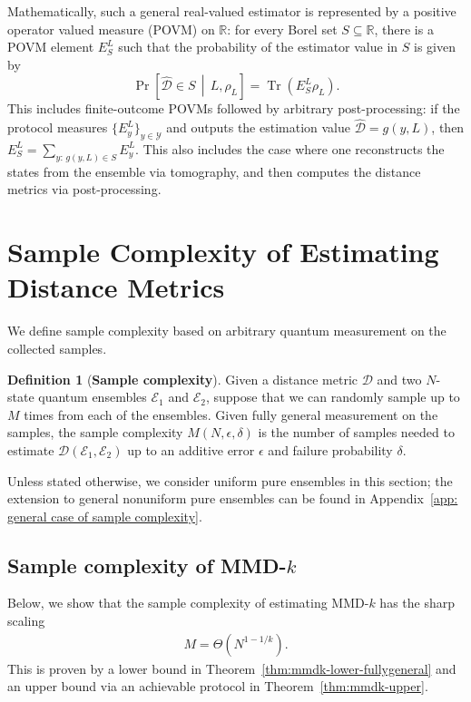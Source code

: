 \documentclass[aps,prx,reprint,superscriptaddress,amsmath,amssymb,longbibliography,floatfix]{revtex4-2}
\newcommand{\dsR}{\mathbb{R}}
\newcommand{\scD}{\mathcal{D}}
\newcommand{\scE}{\mathcal{E}}
\newcommand{\scY}{\mathcal{Y}}
\newcommand{\Tr}{\operatorname{Tr}}
\theoremstyle{plain}
\theoremstyle{definition}
\newtheorem{definition}[theorem]{Definition}
\theoremstyle{remark}
\begin{document}
Mathematically, such a general real-valued estimator is represented by a positive operator valued measure (POVM) on $\dsR$: for every Borel set $S\subseteq\dsR$, there is a POVM element $E_S^L$ such that the probability of the estimator value in $S$ is given by
\begin{equation}
\Pr\!\left[\widehat{\scD}\in S\,\middle|\,L,\rho_L\right]=\Tr(E_S^L\rho_L).
\end{equation}
This includes finite-outcome POVMs followed by arbitrary post-processing: if the protocol measures $\{E_y^L\}_{y\in\scY}$ and outputs the estimation value $\widehat{\scD}=g(y,L)$, then
$
E_S^L=\sum_{y:\,g(y,L)\in S}E_y^L.
$ 
This also includes the case where one reconstructs the states from the ensemble via tomography, and then computes the distance metrics via post-processing.







\section{Sample Complexity of Estimating Distance Metrics}\label{sec: sample complexity}

We define sample complexity based on arbitrary quantum measurement on the collected samples.
\begin{definition}[\textbf{Sample complexity}]
    Given a distance metric $\scD$ and two $N$-state quantum ensembles $\scE_1$ and $\scE_2$, suppose that we can randomly sample up to $M$ times from each of the ensembles. Given fully general measurement on the samples, the sample complexity $M(N,\epsilon,\delta)$ is the number of samples needed to estimate $\scD(\scE_1, \scE_2)$ up to an additive error $\epsilon$ and failure probability $\delta$.\label{def: sample complexity general}
\end{definition}
Unless stated otherwise, we consider uniform pure ensembles in this section; the extension to general nonuniform pure ensembles can be found in Appendix~\ref{app: general case of sample complexity}.



\subsection{Sample complexity of MMD-$k$}
\label{secsub: sc of MMDk general}



Below, we show that the sample complexity of estimating MMD-$k$ has the sharp scaling
\begin{align}
M=\Theta\!\left(N^{1-1/k}\right).
\label{M_scaling_tight}
\end{align}
This is proven by a lower bound in Theorem~\ref{thm:mmdk-lower-fullygeneral} and an upper bound via an achievable protocol in Theorem~\ref{thm:mmdk-upper}.
\end{document}

